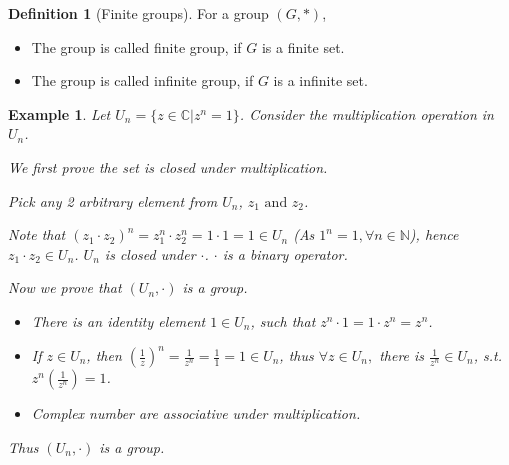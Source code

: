 \documentclass{article}
\theoremstyle{MyNonumberplain}
\theoremstyle{break}
\theoremstyle{break}
\newtheorem{example}{Example}[section]
\theoremstyle{break}
\theoremstyle{definition}
\theoremstyle{break}
\newtheorem{definition}{Definition}[section]
\begin{document}
\begin{defbox}
    \begin{definition}[Finite groups]
        For a group $(G, \ast)$,\bigskip
        \begin{itemize}
            \item The group is called finite group, if $G$ is a finite set.
            
            \item The group is called infinite group, if $G$ is a infinite set.
        \end{itemize}
    \end{definition}
\end{defbox}

\begin{expbox}
    \begin{example}
        Let $U_n = \{ z \in \mathbb{C}|z^n = 1 \}$. Consider the multiplication operation in $U_n$.

        \begin{ansbox}
            We first prove the set is closed under multiplication. \bigskip

            Pick any 2 arbitrary element from $U_n$, $z_1 \text{ and } z_2$.\bigskip
    
            Note that $(z_1 \cdot z_2)^n = z_1^n \cdot z^n_2 = 1 \cdot 1 = 1 \in U_n$ (As
            $1^n = 1, \forall n \in \mathbb{N}$), hence $z_1 \cdot z_2 \in U_n$. $U_n$ is
            closed under $\cdot$. $\cdot$ is a binary operator.\bigskip
    
            Now we prove that $(U_n, \cdot)$ is a group.\bigskip
    
            \begin{itemize}
            \item There is an identity element $1 \in U_n$, such that $z^n \cdot 1 = 1
            \cdot z^n = z^n$.\bigskip
            
            \item If $z \in U_n$, then $\left( \frac{1}{z} \right)^n = \frac{1}{z^n} =
            \frac{1}{1} = 1 \in U_n$, thus $\forall z \in U_n,$ there is $\frac{1}{z^n}\in U_n$,
            s.t. $z^n \left( \frac{1}{z^n} \right) = 1$.\bigskip
            
            \item Complex number are associative under multiplication.\bigskip
            \end{itemize}
            Thus $(U_n, \cdot)$ is a group.\bigskip
    

\end{ansbox}
\end{example}
\end{expbox}
\end{document}
